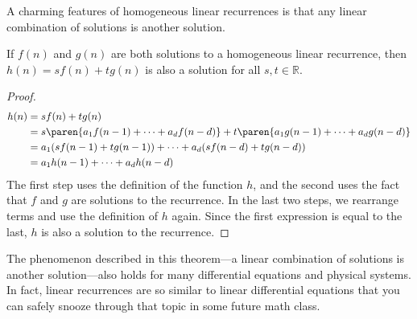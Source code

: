 A charming features of homogeneous linear recurrences is that any
linear combination of solutions is another solution.
\begin{theorem}
\label{th:recur-linearity}
  If $f(n)$ and $g(n)$ are both solutions to a homogeneous linear
  recurrence, then $h(n) = s f(n) + t g(n)$ is also a solution for all $s, t \in
  \mathbb{R}$.
\end{theorem}
\begin{proof}
\begin{align*}
h(n) & = sf(n) + tg(n) \\
  & = s \paren{a_1 f(n-1) + \cdots + a_d f(n - d)}
        + t \paren{a_1 g(n-1) + \cdots + a_d g(n - d)} \\
 & = a_1 (s f(n-1) + t g(n-1)) + \cdots + a_d (s f(n-d) + t g(n-d)) \\
  & =  a_1 h(n-1) + \cdots + a_d h(n-d)
\end{align*}
The first step uses the definition of the function $h$, and the second
uses the fact that $f$ and $g$ are solutions to the recurrence.  In
the last two steps, we rearrange terms and use the definition of $h$
again.  Since the first expression is equal to the last, $h$ is also a
solution to the recurrence.
\end{proof}

The phenomenon described in this theorem---a linear combination of
solutions is another solution---also holds for many differential
equations and physical systems.  In fact, linear recurrences are so
similar to linear differential equations that you can safely snooze
through that topic in some future math class.

